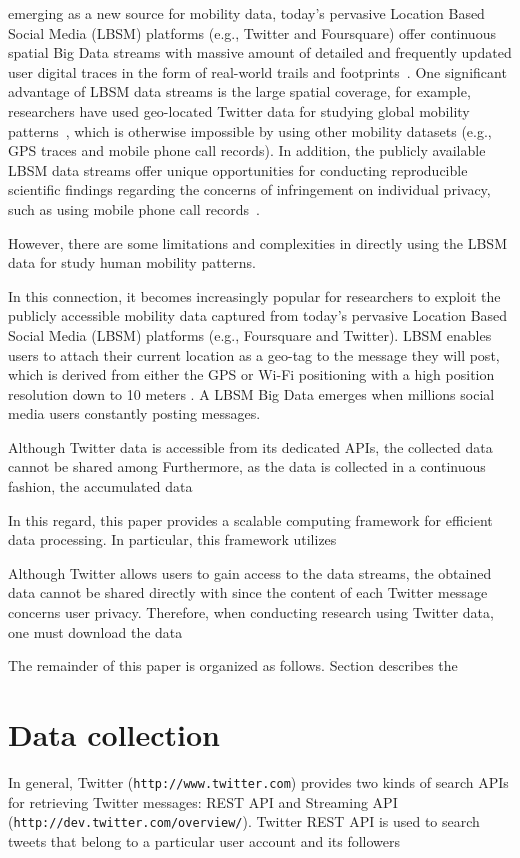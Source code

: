 \documentclass[a4paper,11pt]{article}
\begin{document}
emerging as a new source for mobility data, today's pervasive Location Based Social Media (LBSM) platforms (e.g., Twitter and Foursquare) offer continuous spatial Big Data streams with massive amount of detailed and frequently updated user digital traces in the form of real-world trails and footprints~\cite{thatcher2014}.
One significant advantage of LBSM data streams is the large spatial coverage, for example, researchers have used geo-located Twitter data for studying global mobility patterns~\cite{hawelka2014geo}, which is otherwise impossible by using other mobility datasets (e.g., GPS traces and mobile phone call records). 
In addition, the publicly available LBSM data streams offer unique opportunities for conducting reproducible scientific findings regarding the concerns of infringement on individual privacy, such as using mobile phone call records~\cite{giannotti2008mobility,crampton2014collect,Jurdak2015}.



However, there are some limitations and complexities in directly using the LBSM data for study human mobility patterns. 

In this connection, it becomes increasingly popular for researchers to exploit the publicly accessible mobility data captured from today's pervasive Location Based Social Media (LBSM) platforms (e.g., Foursquare and Twitter).
LBSM enables users to attach their current location as a geo-tag to the message they will post, which is derived from either the GPS or Wi-Fi positioning with a high position resolution down to 10 meters \cite{Jurdak2015}.
A LBSM Big Data emerges when millions social media users constantly posting messages.


Although Twitter data is accessible from its dedicated APIs, the collected data cannot be shared among
Furthermore, as the data is collected in a continuous fashion, the accumulated data

In this regard, this paper provides a scalable computing framework for efficient data processing.
In particular, this framework utilizes 

Although Twitter allows users to gain access to the data streams, the obtained data cannot be shared directly with 
since the content of each Twitter message concerns user privacy. Therefore, when conducting research using Twitter data, one must download the data

The remainder of this paper is organized as follows. Section describes the 

\section*{Data collection}
In general, Twitter ({\tt{http://www.twitter.com}}) provides two kinds of search APIs for retrieving Twitter messages:  REST API and Streaming API ({\tt{http://dev.twitter.com/overview/}}). 
Twitter REST API is used to search tweets that belong to a particular user account and its followers  
\end{document}
